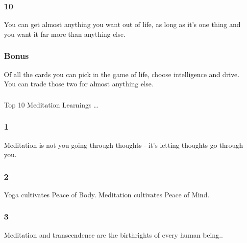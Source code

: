 \begin{frame}[fragile]\frametitle{10}
\begin{center}
You can get almost anything you want out of life, as long as it's one thing and you want it far more than anything else.
\end{center}
\end{frame}


\begin{frame}[fragile]\frametitle{Bonus}
\begin{center}
Of all the cards you can pick in the game of life, choose intelligence and drive. You can trade those two for almost anything else.
\end{center}
\end{frame}


\begin{frame}[fragile]\frametitle{}
\begin{center}
{\Large Top 10 Meditation Learnings \ldots }

\end{center}
\end{frame}

\begin{frame}[fragile]\frametitle{1}
\begin{center}
Meditation is not you going through thoughts - it’s letting thoughts go through you.
\end{center}
\end{frame}

\begin{frame}[fragile]\frametitle{2}
\begin{center}
Yoga cultivates Peace of Body. Meditation cultivates Peace of Mind.
\end{center}
\end{frame}

\begin{frame}[fragile]\frametitle{3}
\begin{center}
Meditation and transcendence are the birthrights of every human being..
\end{center}
\end{frame}

